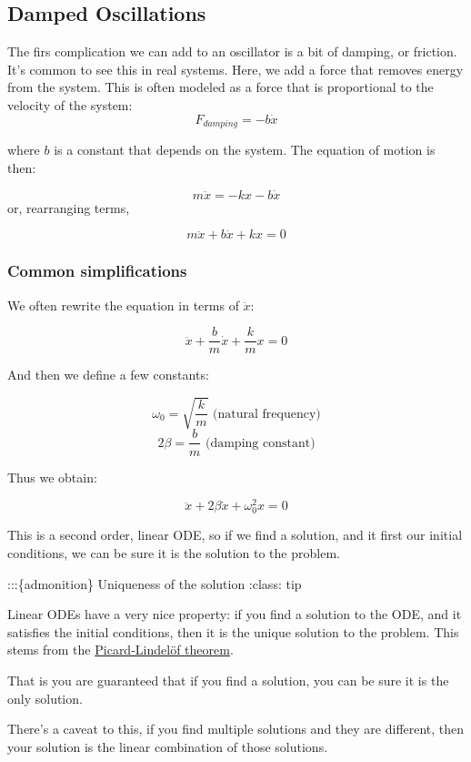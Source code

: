 \documentclass[11pt]{article}
\begin{document}
    \subsection{Damped Oscillations}\label{damped-oscillations}

The firs complication we can add to an oscillator is a bit of damping,
or friction. It's common to see this in real systems. Here, we add a
force that removes energy from the system. This is often modeled as a
force that is proportional to the velocity of the system:
\[F_{damping} = -b\dot{x}\]

where \(b\) is a constant that depends on the system. The equation of
motion is then:

\[m\ddot{x} = -kx - b\dot{x}\] or, rearranging terms,

\[m\ddot{x} + b\dot{x} + kx = 0\]

\subsubsection{Common simplifications}\label{common-simplifications}

We often rewrite the equation in terms of \(\ddot{x}\):

\[\ddot{x} + \dfrac{b}{m}\dot{x} + \dfrac{k}{m}x = 0\]

And then we define a few constants:

\[\omega_0 = \sqrt{\dfrac{k}{m}} \text{ (natural frequency)}\]
\[2\beta = \dfrac{b}{m} \text{ (damping constant)}\]

Thus we obtain:

\[\ddot{x} + 2\beta\dot{x} + \omega_0^2 x = 0\]

This is a second order, linear ODE, so if we find a solution, and it
first our initial conditions, we can be sure it is the solution to the
problem.

:::\{admonition\} Uniqueness of the solution :class: tip

Linear ODEs have a very nice property: if you find a solution to the
ODE, and it satisfies the initial conditions, then it is the unique
solution to the problem. This stems from the
\href{https://en.wikipedia.org/wiki/Picard\%E2\%80\%93Lindel\%C3\%B6f_theorem}{Picard-Lindelöf
theorem}.

That is you are guaranteed that if you find a solution, you can be sure
it is the only solution.

There's a caveat to this, if you find multiple solutions and they are
different, then your solution is the linear combination of those
solutions.
\end{document}
